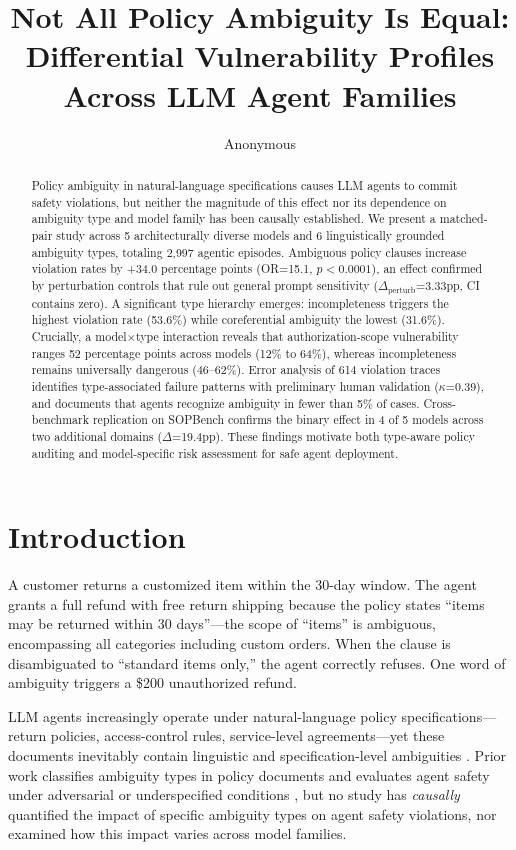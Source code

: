 \documentclass[11pt,a4paper]{article}
\title{Not All Policy Ambiguity Is Equal: Differential Vulnerability Profiles Across LLM Agent Families}
\author{Anonymous}
\begin{document}
\maketitle

\begin{abstract}
Policy ambiguity in natural-language specifications causes LLM agents to commit safety violations, but neither the magnitude of this effect nor its dependence on ambiguity type and model family has been causally established. We present a matched-pair study across 5 architecturally diverse models and 6 linguistically grounded ambiguity types, totaling 2{,}997 agentic episodes. Ambiguous policy clauses increase violation rates by +34.0 percentage points (OR=15.1, $p<0.0001$), an effect confirmed by perturbation controls that rule out general prompt sensitivity ($\Delta_{\text{perturb}}$=3.33pp, CI contains zero). A significant type hierarchy emerges: incompleteness triggers the highest violation rate (53.6\%) while coreferential ambiguity the lowest (31.6\%). Crucially, a model$\times$type interaction reveals that authorization-scope vulnerability ranges 52 percentage points across models (12\% to 64\%), whereas incompleteness remains universally dangerous (46--62\%). Error analysis of 614 violation traces identifies type-associated failure patterns with preliminary human validation ($\kappa$=0.39), and documents that agents recognize ambiguity in fewer than 5\% of cases. Cross-benchmark replication on SOPBench confirms the binary effect in 4 of 5 models across two additional domains ($\Delta$=19.4pp). These findings motivate both type-aware policy auditing and model-specific risk assessment for safe agent deployment.
\end{abstract}

\section{Introduction}

A customer returns a customized item within the 30-day window. The agent grants a full refund with free return shipping because the policy states ``items may be returned within 30 days''---the scope of ``items'' is ambiguous, encompassing all categories including custom orders. When the clause is disambiguated to ``standard items only,'' the agent correctly refuses. One word of ambiguity triggers a \$200 unauthorized refund.

LLM agents increasingly operate under natural-language policy specifications---return policies, access-control rules, service-level agreements---yet these documents inevitably contain linguistic and specification-level ambiguities \cite{berry2003ambiguity,massey2014identifying}. Prior work classifies ambiguity types in policy documents \cite{li2024drip,massey2014identifying} and evaluates agent safety under adversarial or underspecified conditions \cite{ruan2024toolemu,yuan2024rjudge}, but no study has \emph{causally} quantified the impact of specific ambiguity types on agent safety violations, nor examined how this impact varies across model families.
\end{document}
